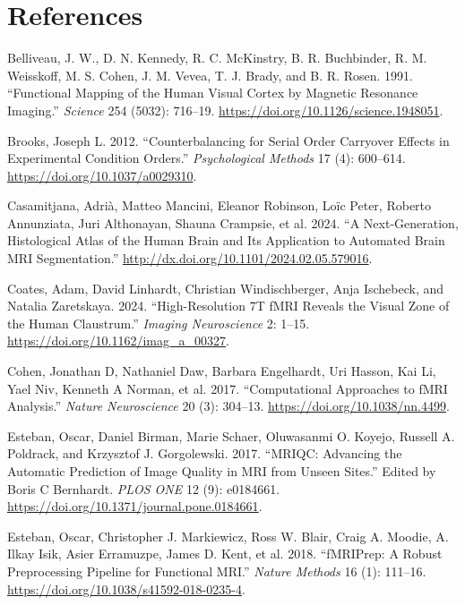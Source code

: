 \documentclass[
  letterpaper,
]{report}
\newlength{\cslhangindent}
\newenvironment{CSLReferences}[2] %
 {\begin{list}{}{%
  \setlength{\itemindent}{0pt}
  \setlength{\leftmargin}{0pt}
  \setlength{\parsep}{0pt}
  \ifodd #1
   \setlength{\leftmargin}{\cslhangindent}
   \setlength{\itemindent}{-1\cslhangindent}
  \fi
  \setlength{\itemsep}{#2\baselineskip}}}
 {\end{list}}
\begin{document}
\section*{References}\label{references-1}

\label{refs}
\begin{CSLReferences}{1}{0}
Belliveau, J. W., D. N. Kennedy, R. C. McKinstry, B. R. Buchbinder, R.
M. Weisskoff, M. S. Cohen, J. M. Vevea, T. J. Brady, and B. R. Rosen.
1991. {``Functional Mapping of the Human Visual Cortex by Magnetic
Resonance Imaging.''} \emph{Science} 254 (5032): 716--19.
\url{https://doi.org/10.1126/science.1948051}.

Brooks, Joseph L. 2012. {``Counterbalancing for Serial Order Carryover
Effects in Experimental Condition Orders.''} \emph{Psychological
Methods} 17 (4): 600--614. \url{https://doi.org/10.1037/a0029310}.

Casamitjana, Adrià, Matteo Mancini, Eleanor Robinson, Loïc Peter,
Roberto Annunziata, Juri Althonayan, Shauna Crampsie, et al. 2024. {``A
Next-Generation, Histological Atlas of the Human Brain and Its
Application to Automated Brain MRI Segmentation.''}
\url{http://dx.doi.org/10.1101/2024.02.05.579016}.

Coates, Adam, David Linhardt, Christian Windischberger, Anja Ischebeck,
and Natalia Zaretskaya. 2024. {``High-Resolution 7T fMRI Reveals the
Visual Zone of the Human Claustrum.''} \emph{Imaging Neuroscience} 2:
1--15. \url{https://doi.org/10.1162/imag_a_00327}.

Cohen, Jonathan D, Nathaniel Daw, Barbara Engelhardt, Uri Hasson, Kai
Li, Yael Niv, Kenneth A Norman, et al. 2017. {``Computational Approaches
to fMRI Analysis.''} \emph{Nature Neuroscience} 20 (3): 304--13.
\url{https://doi.org/10.1038/nn.4499}.

Esteban, Oscar, Daniel Birman, Marie Schaer, Oluwasanmi O. Koyejo,
Russell A. Poldrack, and Krzysztof J. Gorgolewski. 2017. {``MRIQC:
Advancing the Automatic Prediction of Image Quality in MRI from Unseen
Sites.''} Edited by Boris C Bernhardt. \emph{PLOS ONE} 12 (9): e0184661.
\url{https://doi.org/10.1371/journal.pone.0184661}.

Esteban, Oscar, Christopher J. Markiewicz, Ross W. Blair, Craig A.
Moodie, A. Ilkay Isik, Asier Erramuzpe, James D. Kent, et al. 2018.
{``fMRIPrep: A Robust Preprocessing Pipeline for Functional MRI.''}
\emph{Nature Methods} 16 (1): 111--16.
\url{https://doi.org/10.1038/s41592-018-0235-4}.


\end{CSLReferences}
\end{document}
